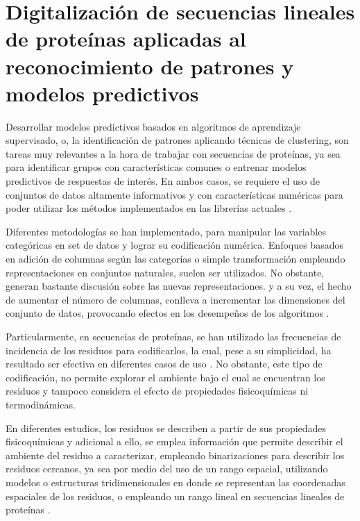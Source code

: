 \chapter{Digitalización de secuencias lineales de proteínas aplicadas al reconocimiento de patrones y modelos predictivos \label{cap3}}

\ifpdf
    \graphicspath{{Chapter3/Figs/Raster/}{Chapter3/Figs/PDF/}{Chapter3/Figs/}}
\else
    \graphicspath{{Chapter3/Figs/Vector/}{Chapter3/Figs/}}
\fi

Desarrollar modelos predictivos basados en algoritmos de aprendizaje supervisado, o, la identificación de patrones aplicando técnicas de clustering, son tareas muy relevantes a la hora de trabajar con secuencias de proteínas, ya sea para identificar grupos con características comunes o entrenar modelos predictivos de respuestas de interés. En ambos casos, se requiere el uso de conjuntos de datos altamente informativos y con características numéricas para poder utilizar los métodos implementados en las librerías actuales \cite{pedregosa2011scikit}.

Diferentes metodologías se han implementado, para manipular las variables categóricas en set de datos y lograr su codificación numérica. Enfoques basados en adición de columnas según las categorías o simple transformación empleando representaciones en conjuntos naturales, suelen ser utilizados. No obstante, generan bastante discusión sobre las nuevas representaciones. y a su vez, el hecho de aumentar el número de columnas, conlleva a incrementar las dimensiones del conjunto de datos, provocando efectos en los desempeños de los algoritmos \cite{pedregosa2011scikit}. 

Particularmente, en secuencias de proteínas, se han utilizado las frecuencias de incidencia de los residuos para codificarlos, la cual, pese a su simplicidad, ha resultado ser efectiva en diferentes casos de uso \cite{ozbudak2014protein}. No obstante, este tipo de codificación, no permite explorar el ambiente bajo el cual se encuentran los residuos y tampoco considera el efecto de propiedades fisicoquímicas ni termodinámicas.

En diferentes estudios, los residuos se describen a partir de sus propiedades fisicoquímicas y adicional a ello, se emplea información que permite describir el ambiente del residuo a caracterizar, empleando binarizaciones para describir los residuos cercanos, ya sea por medio del uso de un rango espacial, utilizando modelos o estructuras tridimensionales en donde se representan las coordenadas espaciales de los residuos, o empleando un rango lineal en secuencias lineales de proteínas \cite{capriotti2005mutant2, capriotti2008three}.

